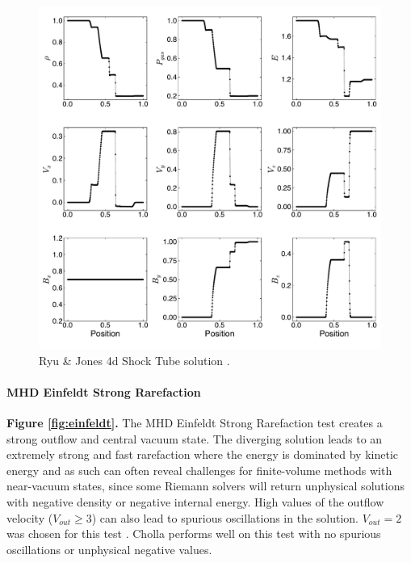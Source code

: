 \documentclass[modern, linenumbers]{aastex631}
\newcommand*{\img}[1]{%
    \raisebox{-.3\baselineskip}{%
        \texttt{[image: \#1]}%
    }%
}
\begin{document}
\begin{figure}[ht!]
    \includegraphics[width=\linewidth]{rj4d.pdf}
    \caption{Ryu \& Jones 4d Shock Tube solution \citep{ryu_jones_1995}.
    \href{https://github.com/bcaddy/caddy-et-al-2023/blob/4c9c5ef905902e54e50943d0a261bd5b08342225/python/shock-tubes.py}{\img{github.png}}}
    \label{fig:rj-4d}
\end{figure}

\paragraph{MHD Einfeldt Strong Rarefaction}
\textbf{Figure \ref{fig:einfeldt}.}
The MHD Einfeldt Strong Rarefaction test \citep{einfeldt_1991} creates a strong outflow and central vacuum state. The diverging solution leads to an extremely strong and fast rarefaction where the energy is dominated by kinetic energy and as such can often reveal challenges for finite-volume methods with near-vacuum states, since some Riemann solvers will return unphysical solutions with negative density or negative internal energy. High values of the outflow velocity ($V_{out}\ge3$) can also lead to spurious oscillations in the solution. $V_{out} = 2$ was chosen for this test \citep{charm_2011}. Cholla performs well on this test with no spurious oscillations or unphysical negative values.
\end{document}
